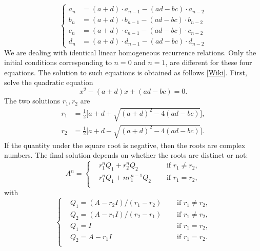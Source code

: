 \documentclass[oneside,10pt]{book}
\begin{document}
\begin{equation*}
  \left\{
    \begin{aligned}
      a_n & =(a+d)\cdot a_{n-1}-(ad-bc)\cdot a_{n-2}\\
      b_n & =(a+d)\cdot b_{n-1}-(ad-bc)\cdot b_{n-2}\\
      c_n & =(a+d)\cdot c_{n-1}-(ad-bc)\cdot c_{n-2}\\
      d_n & =(a+d)\cdot d_{n-1}-(ad-bc)\cdot d_{n-2}
    \end{aligned}
  \right.
\end{equation*}
We are dealing with identical linear homogeneous recurrence relations. Only the initial conditions corresponding to $n = 0$ and $n = 1$, are different for these four equations. The solution to such equations is obtained as follows [\href{https://en.wikipedia.org/wiki/Linear_recurrence_with_constant_coefficients}{Wiki}]. First, solve the quadratic equation
\begin{equation}\label{cplr}
x^2 - (a+d)x + (ad-bc)=0.
\end{equation}
The two solutions $r_1,r_2$ are
$$
\begin{aligned}
      r_1 & =\frac{1}{2}\Big[a+d+ \sqrt{(a+d)^2-4(ad-bc)}\Big],\\
      r_2 & =\frac{1}{2}\Big[a+d-\sqrt{(a+d)^2-4(ad-bc)}\Big].
\end{aligned}
$$
If the quantity under the square root is negative, then the roots are complex numbers. The final solution depends on whether the roots are distinct or not:
\begin{equation}\label{linea1}
A^n=\left\{
\begin{aligned}
      & r_1^n Q_1 + r_2^n Q_2 & \quad \text{ if } r_1\neq r_2,\\
     & r_1^n Q_1 + n r_1^{n-1} Q_2 & \quad \text{ if } r_1= r_2,\\
\end{aligned}
\right.
\end{equation}
with
\begin{equation}\label{linea2}
\left\{
\begin{aligned}
      & Q_1 = (A-r_2 I)/(r_1-r_2) & \quad \text{ if } r_1\neq r_2,\\
     &  Q_2 = (A-r_1 I)/(r_2-r_1) & \quad \text{ if } r_1\neq r_2,\\
    & Q_1 = I & \quad \text{ if } r_1= r_2,\\
   & Q_2 = A-r_1 I & \quad \text{ if } r_1= r_2.\\
\end{aligned}
\right.
\end{equation}
\end{document}
